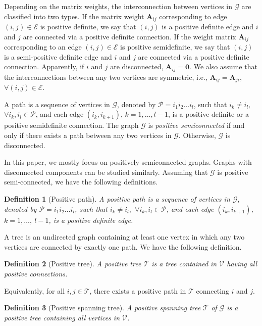 \documentclass[draftclsnofoot,11pt,onecolumn]{IEEEtran}
\newtheorem{Definition}{Definition}
\newcommand{\m}[1]{\mathbf{#1}}
\newcommand{\mc}[1]{\mathcal{#1}}
\begin{document}
Depending on the matrix weights, the interconnection between vertices in $\mc{G}$ are classified into two types. If the matrix weight $\m{A}_{ij}$ corresponding to edge $(i,j) \in \mc{E}$ is positive definite, we say that $(i,j)$ is a positive definite edge and $i$ and $j$ are connected via a positive definite connection. If the weight matrix $\m{A}_{ij}$ corresponding to an edge $(i,j) \in \mc{E}$ is positive semidefinite, we say that $(i,j)$ is a semi-positive definite edge and $i$ and $j$ are connected via a positive definite connection. Apparently, if $i$ and $j$ are disconnected, $\m{A}_{ij} = \m{0}$. We also assume that the interconnections between any two vertices are symmetric, i.e., $\m{A}_{ij} = \m{A}_{ji}$, $\forall (i,j) \in \mc{E}$. 

A path is a sequence of vertices in $\mc{G}$, denoted by $\mc{P} = i_1i_2\ldots i_l$, such that $i_k \neq i_l,$ $\forall i_k, i_l \in \mc{P}$, and each edge $(i_k,i_{k+1})$, $k=1, \ldots, l-1$, is a positive definite or a positive semidefinite connection. The graph $\mc{G}$ is \emph{positive semiconnected} if and only if there exists a path between any two vertices in $\mc{G}$. Otherwise, $\mc{G}$ is disconnected.

In this paper, we mostly focus on positively semiconnected graphs. Graphs with disconnected components can be studied similarly. Assuming that $\mc{G}$ is positive semi-connected, we have the following definitions.

\begin{Definition}[Positive path]\label{def:pos_path} A positive path is a sequence of vertices in $\mc{G}$, denoted by $\mc{P} = i_1i_2\ldots i_l$, such that $i_k \neq i_l,$ $\forall i_k, i_l \in \mc{P}$, and each edge $(i_k,i_{k+1})$, $k=1, \ldots,~l-1$, is a positive definite edge.
\end{Definition}

A tree is an undirected graph containing at least one vertex in which any two vertices are connected by exactly one path. We have the following definition.

\begin{Definition}[Positive tree]\label{def:pos_tree} A positive tree $\mc{T}$ is a tree contained in $\mc{V}$ having all positive connections.
\end{Definition}

Equivalently, for all $i, j \in \mc{T}$, there exists a positive path in $\mc{T}$ connecting $i$ and $j$.

\begin{Definition}[Positive spanning tree]\label{def:pos_span_tree} A positive spanning tree $\mc{T}$ of $\mc{G}$ is a positive tree containing all vertices in $\mc{V}$.
\end{Definition}
\end{document}
